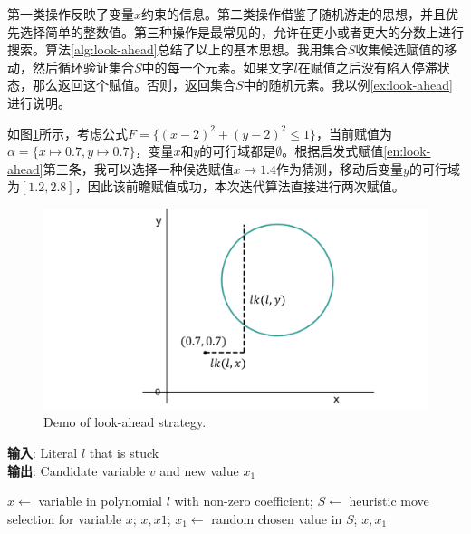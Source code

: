 第一类操作反映了变量$x$约束的信息。第二类操作借鉴了随机游走的思想，并且优先选择简单的整数值。第三种操作是最常见的，允许在更小或者更大的分数上进行搜索。算法\ref{alg:look-ahead}总结了以上的基本思想。我用集合$S$收集候选赋值的移动，然后循环验证集合$S$中的每一个元素。如果文字$l$在赋值之后没有陷入停滞状态，那么返回这个赋值。否则，返回集合$S$中的随机元素。我以例\ref{ex:look-ahead}进行说明。

\begin{example}
如图\ref{fig:look-ahead}所示，考虑公式$F = \{(x - 2)^2 + (y - 2)^2 \leq 1\}$，当前赋值为$\alpha = \{x \mapsto 0.7, y \mapsto 0.7\}$，变量$x$和$y$的可行域都是$\emptyset$。根据启发式赋值\ref{en:look-ahead}第三条，我可以选择一种候选赋值$x \mapsto 1.4$作为猜测，移动后变量$y$的可行域为$[1.2, 2.8]$，因此该前瞻赋值成功，本次迭代算法直接进行两次赋值。

\begin{figure}[t]
    \centering
    \includegraphics[width=0.7\columnwidth]{Img/look-ahead.png}
     {Demo of look-ahead strategy.}
\label{fig:look-ahead}
\end{figure}
\label{ex:look-ahead}
\end{example}

\begin{algorithm}[t]
    \caption{Heuristic choice of candidate values and look-ahead for critical moves}
    \label{alg:look-ahead}
    \textbf{输入}: Literal $l$ that is stuck\\
    \textbf{输出}: Candidate variable $v$ and new value $x_1$
    
    \begin{algorithmic}[1] %
        \Statex \hrulefill
        \STATE $x \leftarrow$ variable in polynomial  $l$ with non-zero coefficient;
        \STATE $S \leftarrow$ heuristic move selection for variable $x$;
                \RETURN $x, x1$;
            \ENDIF
        \ENDFOR
        \STATE $x_1 \leftarrow$ random chosen value in $S$;
        \STATE \RETURN $x, x_1$
    \end{algorithmic}
\end{algorithm}

